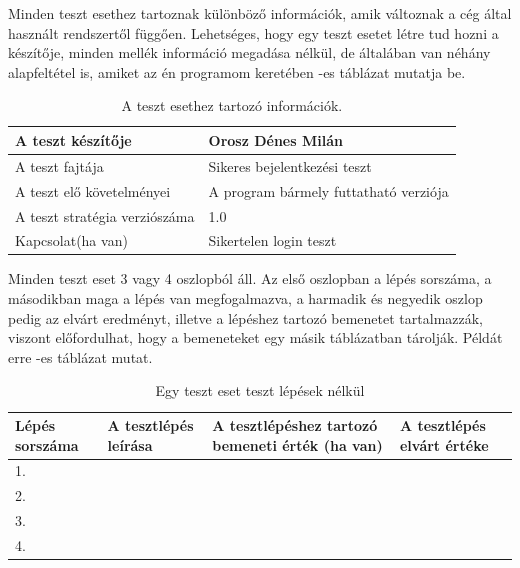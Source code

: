 Minden teszt esethez tartoznak különböző információk, amik változnak a cég által használt rendszertől függően. Lehetséges, hogy egy teszt esetet létre tud hozni a készítője, minden mellék információ megadása nélkül, de általában van néhány alapfeltétel is, amiket az én programom keretében -es táblázat mutatja be.

%

\begin{table} [h]
	\begin{center}
		\caption{A teszt esethez tartozó információk.}
		\label{tab:template}
		\medskip
		\begin{tabular}{ | p{6cm} | p{6cm}| } 
			\hline
			A teszt készítője & Orosz Dénes Milán  \\ 
			\hline
			A teszt fajtája & Sikeres bejelentkezési teszt  \\ 
			\hline
			A teszt elő követelményei & A program bármely futtatható verziója  \\ 
			\hline
			A teszt stratégia verziószáma & 1.0 \\
			\hline
			Kapcsolat(ha van) & Sikertelen login teszt \\
			\hline
		\end{tabular}
	\end{center}

\end{table}
Minden teszt eset 3 vagy 4 oszlopból áll. Az első oszlopban a lépés sorszáma, a másodikban  maga a lépés van megfogalmazva, a harmadik és negyedik oszlop pedig az elvárt eredményt, illetve a lépéshez tartozó bemenetet tartalmazzák, viszont előfordulhat, hogy a bemeneteket egy másik táblázatban tárolják. Példát erre  -es táblázat mutat.\\

\begin{table}[h]
\begin{center}
	\caption{Egy teszt eset teszt lépések nélkül}
\label{table:testcase}
	\resizebox{\textwidth}{!} {
\begin{tabular}{ |p{3cm}|p{5cm}|p{5cm}|p{5cm}|} 
	\hline
	 Lépés sorszáma & A tesztlépés leírása & A tesztlépéshez tartozó bemeneti érték (ha van) & A tesztlépés elvárt értéke  \\ 
	\hline
	1. & & &  \\ 
	\hline
	2. & & &  \\ 
	\hline
	3. & & & \\
	\hline
	4. & & & \\
	\hline
\end{tabular}
}
\end{center}
\end{table}

